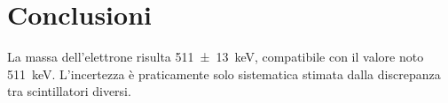\section{Conclusioni}

La massa dell'elettrone risulta \SI{511(13)}{keV},
compatibile con il valore noto \SI{511}{keV}.
L'incertezza è praticamente solo sistematica stimata dalla discrepanza tra scintillatori diversi.
